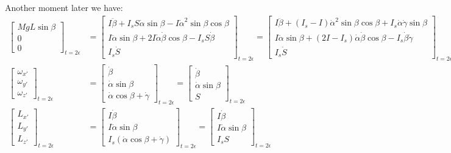 \documentclass[10pt]{article}
\begin{document}
Another moment later we have:
\begin{align*}
    \begin{bmatrix}
        MgL\sin\beta \\
        0 \\
        0 
    \end{bmatrix}_{t=2\epsilon}
    &=
    \begin{bmatrix}
        I\ddot\beta +I_sS\dot\alpha\sin\beta 
            - I\dot\alpha^2\sin\beta\cos\beta \\
        I\ddot\alpha\sin\beta + 2I\dot\alpha\dot\beta\cos\beta 
            -I_sS\dot\beta \\
        I_s\dot S 
    \end{bmatrix}_{t=2\epsilon}
    =
    \begin{bmatrix}
        I\ddot\beta +(I_s-I)\dot\alpha^2\sin\beta\cos\beta 
            +I_s\dot\alpha\dot\gamma\sin\beta \\
        I\ddot\alpha\sin\beta + (2I-I_s)\dot\alpha\dot\beta\cos\beta 
            -I_s\dot\beta\dot\gamma \\
        I_s\dot S 
    \end{bmatrix}_{t=2\epsilon}
    \\
    \begin{bmatrix}
        \omega_{x'} \\
        \omega_{y'} \\
        \omega_{z'}
    \end{bmatrix}_{t=2\epsilon}
    &=
    \begin{bmatrix}
        \dot\beta \\
        \dot\alpha\sin\beta \\
        \dot\alpha\cos\beta+\dot\gamma
    \end{bmatrix}_{t=2\epsilon}
    =
    \begin{bmatrix}
        \dot\beta \\
        \dot\alpha\sin\beta \\
        S
    \end{bmatrix}_{t=2\epsilon}
    \\
    \begin{bmatrix}
        L_{x'} \\
        L_{y'} \\
        L_{z'}
    \end{bmatrix}_{t=2\epsilon}
    &=
    \begin{bmatrix}
        I\dot\beta \\
        I\dot\alpha\sin\beta \\
        I_s(\dot\alpha\cos\beta+\dot\gamma)
    \end{bmatrix}_{t=2\epsilon}
    =
    \begin{bmatrix}
        I\dot\beta \\
        I\dot\alpha\sin\beta \\
        I_sS
    \end{bmatrix}_{t=2\epsilon}
\end{align*}
\end{document}
